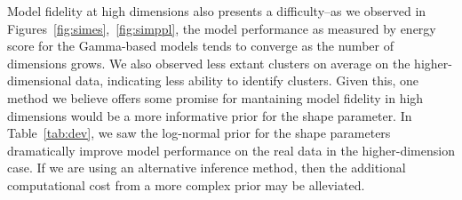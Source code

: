 Model fidelity at high dimensions also presents a difficulty--as we observed in
  Figures~\ref{fig:simes},~\ref{fig:simppl}, the model performance as measured by energy score for the
  Gamma-based models tends to converge as the number of dimensions grows.  We also observed less
  extant clusters on average on the higher-dimensional data, indicating less ability to identify clusters.
  Given this, one method we believe offers some promise for mantaining model fidelity in high dimensions
  would be a more informative prior for the shape parameter.  In Table~\ref{tab:dev}, we saw the
  log-normal prior for the shape parameters dramatically improve model performance on the real data
  in the higher-dimension case.  If we are using an alternative inference method, then the additional
  computational cost from a more complex prior may be alleviated.

